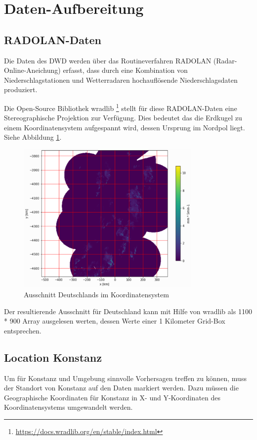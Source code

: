 \clearpage
\section{Daten-Aufbereitung}

\subsection{RADOLAN-Daten}

Die Daten des DWD werden über das Routineverfahren RADOLAN (Radar-Online-Aneichung) erfasst, dass durch eine Kombination von Niederschlagstationen und Wetterradaren hochauflösende Niederschlagsdaten produziert. 

Die Open-Source Bibliothek wradlib \footnote{\url{https://docs.wradlib.org/en/stable/index.html}} stellt für diese RADOLAN-Daten eine Stereographische Projektion zur Verfügung. Dies bedeutet das die Erdkugel zu einem Koordinatensystem aufgespannt wird, dessen Ursprung im Nordpol liegt. Siehe Abbildung  \ref{rz}.

\begin{figure}[H]
	\centering
	\includegraphics[width=0.8\textwidth]{pics/RZ_product.PNG}
	\caption{Ausschnitt Deutschlands im Koordinatensystem}
	\label{rz}
\end{figure}

Der resultierende Ausschnitt für Deutschland kann mit Hilfe von wradlib als 1100 * 900 Array ausgelesen werten, dessen Werte einer 1 Kilometer Grid-Box entsprechen.

\subsection{Location Konstanz}
Um für Konstanz und Umgebung sinnvolle Vorhersagen treffen zu können, muss der Standort von Konstanz auf den Daten markiert werden. Dazu müssen die Geographische Koordinaten für Konstanz in X- und Y-Koordinaten des Koordinatensystems umgewandelt werden. 

